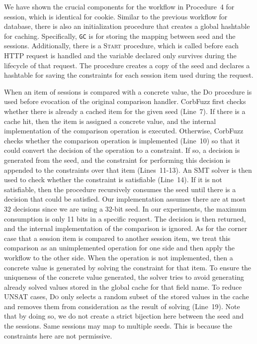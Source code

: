 \documentclass[10pt,conference]{IEEEtran}
\begin{document}
We have shown the crucial components for the workflow in Procedure~4 for session, which is identical for cookie. Similar to the previous workflow for database, there is also an initialization procedure that creates a global hashtable for caching. Specifically, \verb|GC| is for storing the mapping between seed and the sessions. Additionally, there is a \textsc{Start} procedure, which is called before each HTTP request is handled and the variable declared only survives during the lifecycle of that request. The procedure creates a copy of the seed and declares a hashtable for saving the constraints for each session item used during the request.

When an item of sessions is compared with a concrete value, the \textsc{Do} procedure is used before evocation of the original comparison handler. CorbFuzz first checks whether there is already a cached item for the given seed (Line~7). If there is a cache hit, then the item is assigned a concrete value, and the internal implementation of the comparison operation is executed. Otherwise, CorbFuzz checks whether the comparison operation is implemented (Line~10) so that it could convert the decision of the operation to a constraint. If so, a decision is generated from the seed, and the constraint for performing this decision is appended to the constraints over that item (Lines~11-13). An SMT solver is then used to check whether the constraint is satisfiable (Line~14). If it is not satisfiable, then the procedure recursively consumes the seed until there is a decision that could be satisfied. Our implementation assumes there are at most 32 decisions since we are using a 32-bit seed.  In our experiments, the maximum consumption is only 11 bits in a specific request. The decision is then returned, and the internal implementation of the comparison is ignored. As for the corner case that a session item is compared to another session item, we treat this comparison as an unimplemented operation for one side and then apply the workflow to the other side. When the operation is not implemented, then a concrete value is generated by solving the constraint for that item. To ensure the uniqueness of the concrete value generated, the solver tries to avoid generating already solved values stored in the global cache for that field name. To reduce UNSAT cases, \textsc{Do} only selects a random subset of the stored values in the cache and removes them from consideration as the result of solving (Line~19). Note that by doing so, we do not create a strict bijection here between the seed and the sessions. Same sessions may map to multiple seeds. This is because the constraints here are not permissive. 
\end{document}
